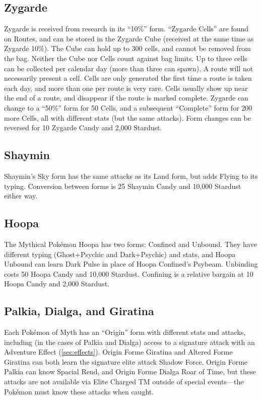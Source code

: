 \subsection{Zygarde\label{sec:zygarde}}
Zygarde is received from research in its ``10\%'' form.
``Zygarde Cells'' are found on Routes, and can be stored in the Zygarde Cube
 (received at the same time as Zygarde 10\%).
The Cube can hold up to 300 cells, and cannot be removed from the bag.
Neither the Cube nor Cells count against bag limits.
Up to three cells can be collected per calendar day (more than three can spawn).
A route will not necessarily present a cell.
Cells are only generated the first time a route is taken each day, and more than one per route is very rare.
Cells usually show up near the end of a route, and disappear if the route is marked complete.
Zygarde can change to a ``50\%'' form for 50 Cells, and a subsequent ``Complete''
 form for 200 more Cells, all with different stats (but the same attacks).
Form changes can be reversed for 10 Zygarde Candy and 2,000 Stardust.

\subsection{Shaymin}
Shaymin's Sky form has the same attacks as its Land form, but adds Flying to its typing.
Conversion between forms is 25 Shaymin Candy and 10,000 Stardust either way.

\subsection{Hoopa\label{subsec:hoopa}}
The Mythical Pokémon Hoopa has two forms: Confined and Unbound.
They have different typing (Ghost+Psychic and Dark+Psychic) and stats,
  and Hoopa Unbound can learn Dark Pulse in place of Hoopa Confined's Psybeam.
Unbinding costs 50 Hoopa Candy and 10,000 Stardust.
Confining is a relative bargain at 10 Hoopa Candy and 2,000 Stardust.

\subsection{Palkia, Dialga, and Giratina}
Each Pokémon of Myth has an ``Origin'' form with different stats and attacks, including
 (in the cases of Palkia and Dialga) access to a signature attack with an Adventure Effect (\autoref{sec:effects}).
Origin Forme Giratina and Altered Forme Giratina can both learn the signature elite attack Shadow Force.
Origin Forme Palkia can know Spacial Rend, and Origin Forme Dialga Roar of Time, but these
 attacks are not available via Elite Charged TM outside of special events---the Pokémon must know these
 attacks when caught.


